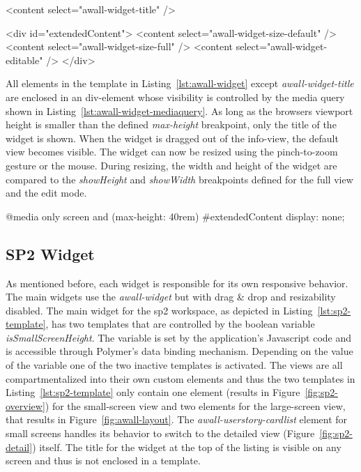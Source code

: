 \documentclass{sigchi}
\begin{document}
\begin{code}[caption={Part of the awall-widget custom element's template using insertion points for the different HTML tags.},label=lst:awall-widget]
<content select="awall-widget-title" />

<div id="extendedContent">
  <content select="awall-widget-size-default" />
  <content select="awall-widget-size-full" />
  <content select="awall-widget-editable" />
</div>
\end{code}


All elements in the template in Listing~\ref{lst:awall-widget} except \textit{awall-widget-title} are enclosed in an div-element whose visibility is controlled by the media query shown in Listing~\ref{lst:awall-widget-mediaquery}.
As long as the browsers viewport height is smaller than the defined \textit{max-height} breakpoint, only the title of the widget is shown.
When the widget is dragged out of the info-view, the default view becomes visible.
The widget can now be resized using the pinch-to-zoom gesture or the mouse.
During resizing, the width and height of the widget are compared to the \textit{showHeight} and \textit{showWidth} breakpoints defined for the full view and the edit mode.

\begin{code}[caption={Media Query hiding all the views except the title when the screen is small enough.},label=lst:awall-widget-mediaquery]
@media only screen and (max-height: 40rem) {
  #extendedContent {
    display: none;
  }
}
\end{code}

\subsection{SP2 Widget}
As mentioned before, each widget is responsible for its own responsive behavior.
The main widgets use the \textit{awall-widget} but with drag \& drop and resizability disabled.
The main widget for the \gls{sp2} workspace, as depicted in Listing~\ref{lst:sp2-template}, has two templates that are controlled by the boolean variable \textit{isSmallScreenHeight}.
The variable is set by the application's Javascript code and is accessible through Polymer's data binding mechanism.
Depending on the value of the variable one of the two inactive templates is activated.
The views are all compartmentalized into their own custom elements and thus the two templates in Listing~\ref{lst:sp2-template} only contain one element (results in Figure~\ref{fig:sp2-overview}) for the small-screen view and two elements for the large-screen view, that results in Figure~\ref{fig:awall-layout}.
The \textit{awall-userstory-cardlist} element for small screens handles its behavior to switch to the detailed view (Figure~\ref{fig:sp2-detail}) itself.
The title for the widget at the top of the listing is visible on any screen and thus is not enclosed in a template.
\end{document}
